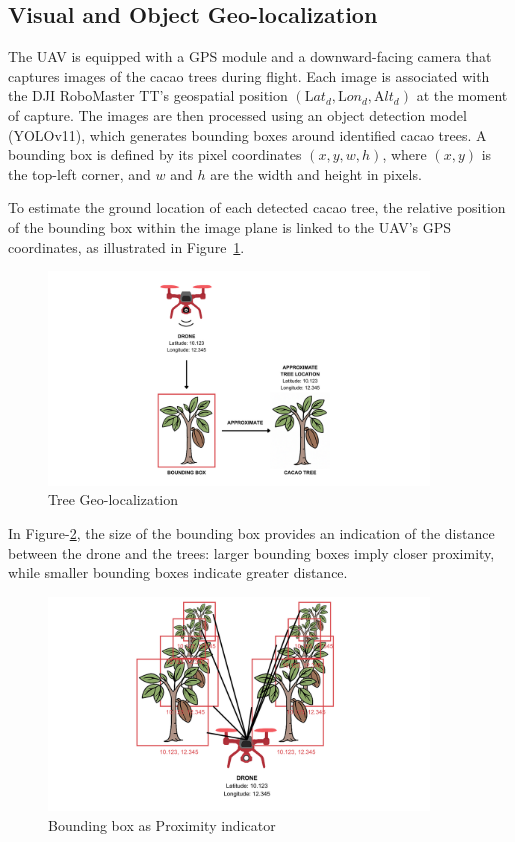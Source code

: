 \subsection*{Visual and Object Geo-localization}

The UAV is equipped with a GPS module and a downward-facing camera that captures images of the cacao trees during flight. Each image is associated with the DJI RoboMaster TT’s geospatial position $(\text{L}at_d, \text{L}on_d, \text{A}lt_d)$ at the moment of capture. The images are then processed using an object detection model (YOLOv11), which generates bounding boxes around identified cacao trees. A bounding box is defined by its pixel coordinates $(x, y, w, h)$, where $(x, y)$ is the top-left corner, and $w$ and $h$ are the width and height in pixels.

To estimate the ground location of each detected cacao tree, the relative position of the bounding box within the image plane is linked to the UAV’s GPS coordinates, as illustrated in Figure~\ref{fig:tree}.

\begin{figure}[H]
	\centering
	\caption{Tree Geo-localization}
	\label{fig:tree}
	\includegraphics[width=0.9\textwidth]{figures/Tree Geolocalization.pdf}
\end{figure}

In Figure-\ref{fig:treex}, the size of the bounding box provides an indication of the distance between the drone and the trees: larger bounding boxes imply closer proximity, while smaller bounding boxes indicate greater distance.

\begin{figure}[H]
	\centering
	\caption{Bounding box as Proximity indicator}
	\label{fig:treex}
	\includegraphics[width=0.9\textwidth]{figures/Bounding box as a Proximity Indicator.pdf}
\end{figure}

